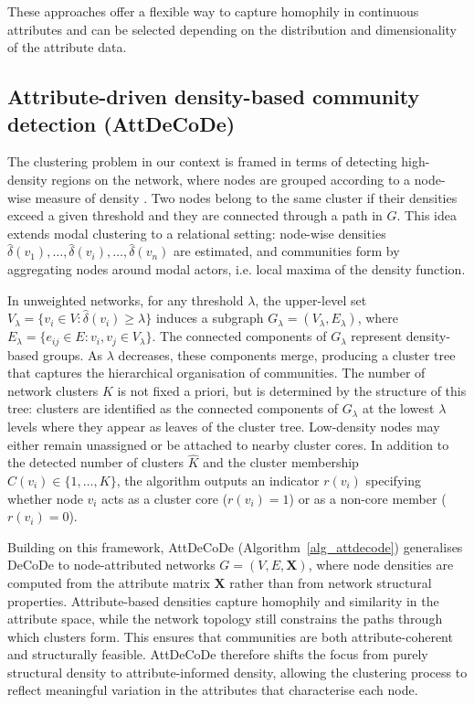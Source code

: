 \documentclass[11pt]{article}
\begin{document}
These approaches offer a flexible way to capture homophily in continuous attributes and can be selected depending on the distribution and dimensionality of the attribute data.

\subsection{Attribute-driven density-based community detection (AttDeCoDe)}

The clustering problem in our context is framed in terms of detecting high-density regions on the network, where nodes are grouped according to a node-wise measure of density \citep{Menardi2022Density-basedNetworks}. Two nodes belong to the 
same cluster if their densities exceed a given threshold and they are connected 
through a path in $G$. This idea extends modal clustering to a relational setting: node-wise densities $\hat\delta(v_1), \ldots, \hat\delta(v_i), \ldots, \hat\delta(v_n)$ are estimated, and communities form by aggregating nodes around modal actors, i.e. local maxima of the density function.

In unweighted networks, for any threshold 
$\lambda$, the upper-level set $V_\lambda = \{ v_i \in V : \hat\delta(v_i) \ge \lambda \}$ 
induces a subgraph $G_\lambda = (V_\lambda, E_\lambda)$, where $E_\lambda = \{ e_{ij} \in E : v_i, v_j \in V_\lambda \}$. 
The connected components of $G_\lambda$ represent density-based groups. As 
$\lambda$ decreases, these components merge, producing a cluster tree that captures the hierarchical organisation of communities. The number of network clusters $K$ is not fixed a priori, but is determined by the structure of this tree: clusters are identified as the connected components of $G_{\lambda}$ at the lowest $\lambda$ levels where they appear as leaves of the cluster tree. Low-density nodes may either remain unassigned or be attached to nearby cluster cores. In addition to the detected number of clusters $\hat K$ and the cluster membership $C(v_i) \in \{1, \ldots, K\}$, the algorithm outputs an indicator $r(v_i)$ specifying whether node $v_i$ acts as a cluster core ($r(v_i)=1$) or as a non-core member ($r(v_i)=0$).

Building on this framework, AttDeCoDe (Algorithm~\ref{alg_attdecode}) generalises DeCoDe to node-attributed networks $G = (V, E, \bm{X})$, where node densities are computed from the attribute matrix $\bm{X}$ rather than from network structural properties. Attribute-based densities capture homophily and similarity in the attribute space, while the network topology still constrains the paths through which clusters form. This ensures that communities are both attribute-coherent and structurally feasible. AttDeCoDe therefore shifts the focus from purely structural density to attribute-informed density, allowing the clustering process to reflect meaningful variation in the attributes that characterise each node. 
\end{document}
